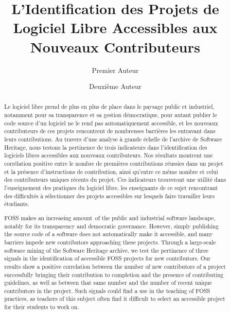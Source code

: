 \documentclass[dvipsnames,runningheads]{llncs}
\title{L'Identification des Projets de Logiciel Libre Accessibles aux Nouveaux Contributeurs}
\author{%
    Premier Auteur\inst{1}%
    \and%
    Deuxième Auteur\inst{2}%
}
\institute{Institution du premier auteur \and institution du deuxième auteur} %
\begin{document}
    \maketitle

    \begin{abstract}
        Le logiciel libre prend de plus en plus de place dans le paysage public et industriel, notamment pour
        sa transparence et sa gestion démocratique, pour autant publier le code source d'un logiciel ne le
        rend pas automatiquement accessible, et les nouveaux contributeurs de ces projets rencontrent de
        nombreuses barrières les entravant dans leurs contributions. Au travers d'une analyse à grande échelle
        de l'archive de Software Heritage, nous testons la pertinence de trois indicateurs dans
        l'identification des logiciels libres accessibles aux nouveaux contributeurs. Nos résultats montrent
        une corrélation positive entre le nombre de premières contributions réussies dans un projet et la
        présence d'instructions de contribution, ainsi qu'entre ce même nombre et celui des contributeurs
        uniques récents du projet. Ces indicateurs trouveront une utilité dans l'enseignement des pratiques du
        logiciel libre, les enseignants de ce sujet rencontrant des difficultés à sélectionner des projets
        accessibles sur lesquels faire travailler leurs étudiants.

    \end{abstract}
    \begin{abstract}
        FOSS makes an increasing amount of the public and industrial software landscape, notably for its
        transparency and democratic governance. However, simply publishing the source code of a software does
        not automatically make it accessible, and many barriers impede new contributors approaching these
        projects. Through a large-scale software mining of the Software Heritage archive, we test the
        pertinence of three signals in the identification of accessible FOSS projects for new contributors.
        Our results show a positive correlation between the number of new contributors of a project
        successfully bringing their contribution to completion and the presence of contributing guidelines, as
        well as between that same number and the number of recent unique contributors in the project. Such
        signals could find a use in the teaching of FOSS practices, as teachers of this subject often find it
        difficult to select an accessible project for their students to work on.

    \end{abstract}
\end{document}
